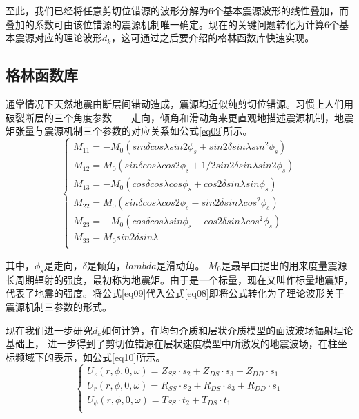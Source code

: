 至此，我们已经将任意剪切位错源的波形分解为6个基本震源波形的线性叠加，而叠加的系数可由该位错源的震源机制唯一确定。现在的关键问题转化为计算6个基本震源对应的理论波形$d_k$，这可通过之后要介绍的格林函数库快速实现。

\subsection{格林函数库}

通常情况下天然地震由断层间错动造成，震源均近似纯剪切位错源。习惯上人们用破裂断层的三个角度参数——走向，倾角和滑动角来更直观地描述震源机制，地震矩张量与震源机制三个参数的对应关系如公式\ref{eq09}所示\citep{Aki1980}。
\begin{equation}
\label{eq09}
\left\{
    \begin{array}{l}
    M_{11}=-M_0(sin{\delta}cos{\lambda}sin{2\phi_s}+sin{2\delta}sin{\lambda}sin^2{\phi_s})\\
    M_{12}=M_0(sin{\delta}cos{\lambda}cos{2\phi_s}+1/2sin{2\delta}sin{\lambda}sin{2\phi_s})\\
    M_{13}=-M_0(cos{\delta}cos{\lambda}cos{\phi_s}+cos{2\delta}sin{\lambda}sin{\phi_s})\\
    M_{22}=M_0(sin{\delta}cos{\lambda}cos{2\phi_s}-sin{2\delta}sin{\lambda}cos^2{\phi_s})\\
    M_{23}=-M_0(cos{\delta}cos{\lambda}sin{\phi_s}-cos{2\delta}sin{\lambda}cos^2{\phi_s})\\
    M_{33}=M_0sin{2\delta}sin{\lambda}\\
    \end{array}
\right.
\end{equation}

其中，$\phi_s$是走向，$\delta$是倾角，$lambda$是滑动角。 $M_0$是最早由\citet{Aki1966}提出的用来度量震源长周期辐射的强度，最初称为地震矩。由于是一个标量，现在又叫作标量地震矩，代表了地震的强度。将公式\ref{eq09}代入公式\ref{eq08}即将公式转化为了理论波形关于震源机制三参数的形式。

现在我们进一步研究$d_k$如何计算，在均匀介质\citep{Ben-Menahem1963}和层状介质\citep{Haskell1964}模型的面波波场辐射理论基础上，\citet{Wang1980} 进一步得到了剪切位错源在层状速度模型中所激发的地震波场，在柱坐标频域下的表示，如公式\ref{eq10}所示。
\begin{equation}
\label{eq10}
\left\{
    \begin{array}{l}
    U_z(r,\phi,0,\omega)=Z_{SS}{\cdot}s_2+Z_{DS}{\cdot}s_3+Z_{DD}{\cdot}s_1\\
    U_r(r,\phi,0,\omega)=R_{SS}{\cdot}s_2+R_{DS}{\cdot}s_3+R_{DD}{\cdot}s_1\\
    U_{\phi}(r,\phi,0,\omega)=T_{SS}{\cdot}t_2+T_{DS}{\cdot}t_1\\
    \end{array}
\right.
\end{equation}

